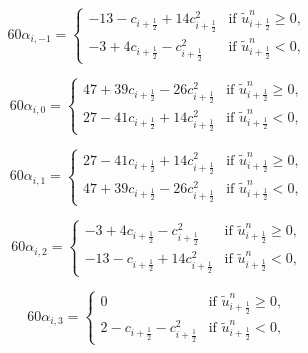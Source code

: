 \begin{equation*}
	60\alpha_{i,-1} =  
    	\begin{cases}
		-13 - c_{i+\frac{1}{2}}  + 14c_{i+\frac{1}{2}}^2 
		& \text{if } \tilde{u}_{i+\frac{1}{2}}^n \geq 0,\\
		-3 +  4c_{i+\frac{1}{2}}   -   c_{i+\frac{1}{2}}^2 & \text{if } \tilde{u}_{i+\frac{1}{2}}^n<0,
    	\end{cases}
\end{equation*}

\begin{equation*}
	60\alpha_{i,0} =  
    	\begin{cases}
		47 + 39c_{i+\frac{1}{2}} - 26c_{i+\frac{1}{2}}^2 
		& \text{if } \tilde{u}_{i+\frac{1}{2}}^n \geq 0,\\
		27 - 41c_{i+\frac{1}{2}}  +  14c_{i+\frac{1}{2}}^2 & \text{if } \tilde{u}_{i+\frac{1}{2}}^n<0,
    	\end{cases}
\end{equation*}

\begin{equation*}
	60\alpha_{i,1} =  
    	\begin{cases}
		27 - 41c_{i+\frac{1}{2}} + 14c_{i+\frac{1}{2}}^2 & \text{if } \tilde{u}_{i+\frac{1}{2}}^n \geq 0,\\
		47 + 39c_{i+\frac{1}{2}} - 26c_{i+\frac{1}{2}}^2 & \text{if } \tilde{u}_{i+\frac{1}{2}}^n<0,
    	\end{cases}
\end{equation*}

\begin{equation*}
	60\alpha_{i,2} =  
    	\begin{cases}
		-3 +  4c_{i+\frac{1}{2}} - c_{i+\frac{1}{2}}^2 
		& \text{if } \tilde{u}_{i+\frac{1}{2}}^n \geq 0,\\
		-13 - c_{i+\frac{1}{2}} +  14c_{i+\frac{1}{2}}^2 & \text{if } \tilde{u}_{i+\frac{1}{2}}^n<0,
    	\end{cases}
\end{equation*}

\begin{equation*}
	60\alpha_{i,3} =  
    	\begin{cases}
		0 & \text{if } \tilde{u}_{i+\frac{1}{2}}^n \geq 0,\\
		2-c_{i+\frac{1}{2}}-   c_{i+\frac{1}{2}}^2 & \text{if } \tilde{u}_{i+\frac{1}{2}}^n<0,
    	\end{cases}
\end{equation*}

